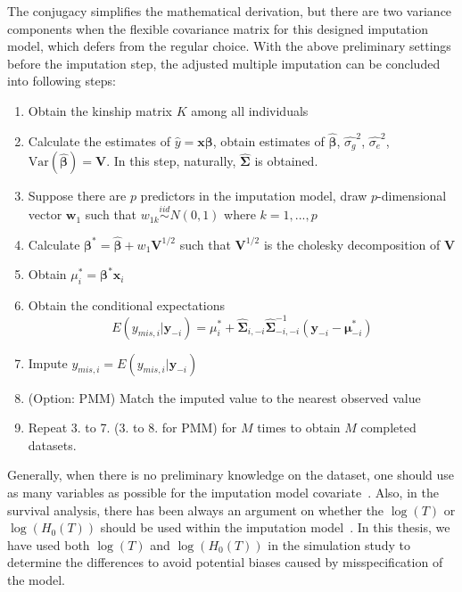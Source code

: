 The conjugacy simplifies the mathematical derivation, but there are two variance components when the flexible covariance matrix for this designed imputation model, which defers from the regular choice. 
With the above preliminary settings before the imputation step, the adjusted multiple imputation can be concluded into following steps: 
\begin{enumerate} 
    \item Obtain the kinship matrix $K$ among all individuals 
    \item Calculate the estimates of $\hat{y}=\mathbf{x}\boldsymbol{\beta}$, obtain estimates of $\hat{\boldsymbol{\beta}}$, $\hat{\sigma_g}^2$, $\hat{\sigma_e}^2$, $\text{Var}(\hat{\boldsymbol{\beta}})=\mathbf{V}$. In this step, naturally, $\boldsymbol{\hat{\Sigma}}$ is obtained.
    \item Suppose there are $p$ predictors in the imputation model, draw $p$-dimensional vector $\mathbf{w}_1$ such that $w_{1k}\stackrel{iid}{\sim} N(0,1)$ where $k=1,...,p$
    \item Calculate $\boldsymbol{\beta}^*=\hat{\boldsymbol{\beta}}+w_1\mathbf{V}^{1/2}$ such that $\mathbf{V}^{1/2}$ is the cholesky decomposition of $\mathbf{V}$
    \item Obtain $\mu_i^*=\boldsymbol{\beta}^*\mathbf{x}_i$
    \item Obtain the conditional expectations 
    \begin{equation}
        E(y_{mis,i}|\mathbf{y}_{-i})=\mu_i^*+\hat{\boldsymbol{\Sigma}}_{i,-i}\hat{\boldsymbol{\Sigma}}_{-i,-i}^{-1}(\mathbf{y}_{-i}-\boldsymbol{\mu}^*_{-i})
    \end{equation}
    \item Impute $y_{mis,i}=E(y_{mis,i}|\mathbf{y}_{-i})$
    \item (Option: PMM) Match the imputed value to the nearest observed value
    \item Repeat 3. to 7. (3. to 8. for PMM) for $M$ times to obtain $M$ completed datasets.
\end{enumerate}
Generally, when there is no preliminary knowledge on the dataset, one should use as many variables as possible for the imputation model covariate~\cite{rubin2018multiple}.
Also, in the survival analysis, there has been always an argument on whether the $\log(T)$ or $\log(H_0(T))$ should be used within the imputation model~\cite{white2009imputing}. 
In this thesis, we have used both $\log(T)$ and $\log(H_0(T))$ in the simulation study to determine the differences to avoid potential biases caused by misspecification of the model. 

